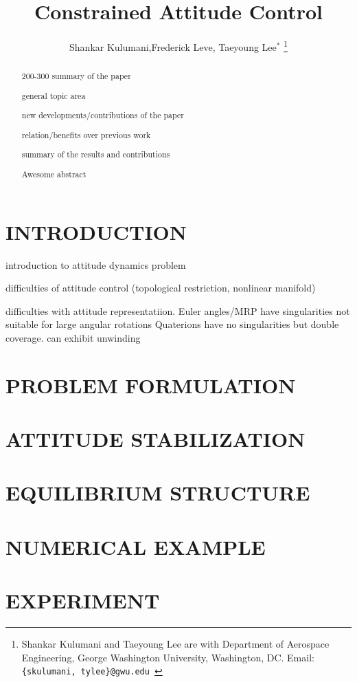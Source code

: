 \documentclass[letterpaper, 10 pt, conference]{ieeeconf}  %
\title{\LARGE \bf
Constrained Attitude Control
}
\author{Shankar Kulumani,Frederick Leve, Taeyoung Lee$^*$
 \thanks{Shankar Kulumani and Taeyoung Lee are with Department of Aerospace Engineering, George Washington University, Washington, DC. Email: {\tt\footnotesize \{skulumani, tylee\}@gwu.edu }}
 }
\begin{document}
\maketitle
\thispagestyle{empty}
\pagestyle{empty}


\begin{abstract}

200-300 summary of the paper

general topic area

new developments/contributions of the paper

relation/benefits over previous work

summary of the results and contributions

Awesome abstract

\end{abstract}


\section{INTRODUCTION}
introduction to attitude dynamics problem

difficulties of attitude control (topological restriction, nonlinear manifold)

difficulties with attitude representatiion.
Euler angles/MRP have singularities not suitable for large angular rotations
Quaterions have no singularities but double coverage. can exhibit unwinding


\section{PROBLEM FORMULATION}

\section{ATTITUDE STABILIZATION}

\section{EQUILIBRIUM STRUCTURE}

\section{NUMERICAL EXAMPLE}

\section{EXPERIMENT}
\end{document}
